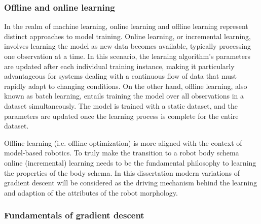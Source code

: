 \subsubsection{Offline and online learning}
In the realm of machine learning, online learning and offline learning represent distinct approaches to model training. Online learning, or incremental learning, involves learning the model as new data becomes available, typically processing one observation at a time. In this scenario, the learning algorithm's parameters are updated after each individual training instance, making it particularly advantageous for systems dealing with a continuous flow of data that must rapidly adapt to changing conditions. On the other hand, offline learning, also known as batch learning, entails training the model over all observations in a dataset simultaneously. The model is trained with a static dataset, and the parameters are updated once the learning process is complete for the entire dataset. %


Offline learning (i.e. offline optimization) is more  aligned with the context of model-based robotics. To truly make the transition to a robot body schema online (incremental) learning needs to be the fundamental philosophy to learning the properties of the body schema. In this dissertation modern variations of gradient descent will be considered as the driving mechanism behind the learning and adaption of the attributes of the robot morphology. 

\subsubsection{Fundamentals of gradient descent}

